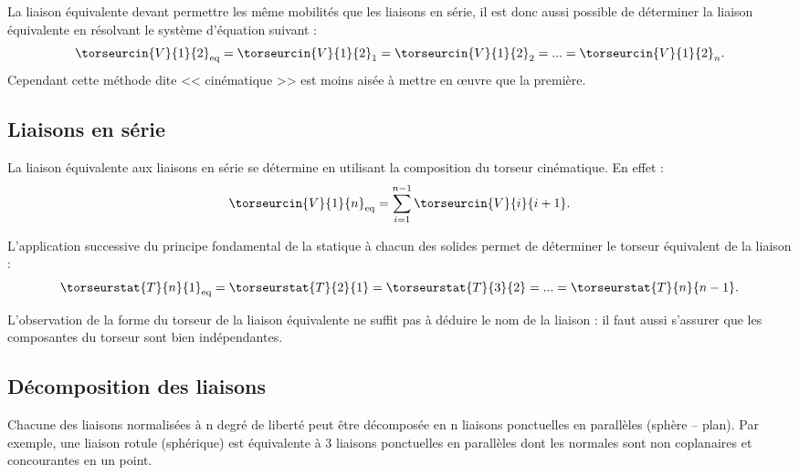 \begin{rem}
La liaison équivalente devant permettre les même mobilités que les liaisons en série, il est donc aussi possible de déterminer la liaison équivalente en résolvant le système d'équation suivant : 
$$
\torseurcin{V}{1}{2}_{\text{eq}} 
= \torseurcin{V}{1}{2}_1
= \torseurcin{V}{1}{2}_2
=...
= \torseurcin{V}{1}{2}_n.
$$ 
Cependant cette méthode dite << cinématique >> est moins aisée à mettre en \oe{}uvre que la première.

\end{rem}
\subsection{Liaisons en série}
\begin{methode}
La liaison équivalente aux liaisons en série se détermine en utilisant la composition du torseur cinématique. En effet : 
$$
\torseurcin{V}{1}{n}_{\text{eq}} = \sum\limits_{i=1}^{n-1}\torseurcin{V}{i}{i+1}.
$$ 
\end{methode}

\begin{rem}
L'application successive du principe fondamental de la statique à chacun des solides permet de déterminer le torseur équivalent de la liaison : 
$$
\torseurstat{T}{n}{1}_{\text{eq}} = 
\torseurstat{T}{2}{1} = 
\torseurstat{T}{3}{2} =
...
=\torseurstat{T}{n}{n-1}.
$$ 
\end{rem}

\begin{warn}
L'observation de la forme du torseur de la liaison équivalente ne suffit pas à déduire le nom de la liaison : il faut aussi s'assurer que les composantes du torseur sont bien indépendantes. 
\end{warn}

\subsection{Décomposition des liaisons}
Chacune des liaisons normalisées $à$ n degré de liberté peut être décomposée en n liaisons ponctuelles en parallèles (sphère -- plan). Par exemple, une liaison rotule (sphérique) est équivalente à 3 liaisons ponctuelles en parallèles dont les normales sont non coplanaires et concourantes en un point.